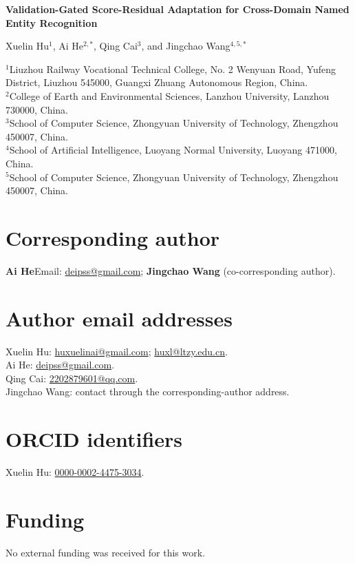 \documentclass[11pt,a4paper]{article}
\begin{document}
\thispagestyle{empty}

\begin{center}
{\LARGE\bfseries Validation-Gated Score-Residual Adaptation for Cross-Domain Named Entity Recognition\par}
\vspace{1.2em}
{\large
Xuelin Hu$^{1}$, Ai He$^{2,*}$, Qing Cai$^{3}$, and Jingchao Wang$^{4,5,*}$\par}
\vspace{1em}
\end{center}

\begin{flushleft}\small
$^{1}$Liuzhou Railway Vocational Technical College, No. 2 Wenyuan Road,
Yufeng District, Liuzhou 545000, Guangxi Zhuang Autonomous Region, China.\\
$^{2}$College of Earth and Environmental Sciences, Lanzhou University,
Lanzhou 730000, China.\\
$^{3}$School of Computer Science, Zhongyuan University of Technology,
Zhengzhou 450007, China.\\
$^{4}$School of Artificial Intelligence, Luoyang Normal University,
Luoyang 471000, China.\\
$^{5}$School of Computer Science, Zhongyuan University of Technology,
Zhengzhou 450007, China.
\end{flushleft}

\section*{Corresponding author}
\textbf{Ai He}\quad Email: \href{mailto:deipss@gmail.com}{deipss@gmail.com};
\textbf{Jingchao Wang} (co-corresponding author).

\section*{Author email addresses}
Xuelin Hu: \href{mailto:huxuelinai@gmail.com}{huxuelinai@gmail.com};
\href{mailto:huxl@ltzy.edu.cn}{huxl@ltzy.edu.cn}.\\
Ai He: \href{mailto:deipss@gmail.com}{deipss@gmail.com}.\\
Qing Cai: \href{mailto:2202879601@qq.com}{2202879601@qq.com}.\\
Jingchao Wang: contact through the corresponding-author address.

\section*{ORCID identifiers}
Xuelin Hu: \href{https://orcid.org/0000-0002-4475-3034}{0000-0002-4475-3034}.

\section*{Funding}
No external funding was received for this work.
\end{document}

